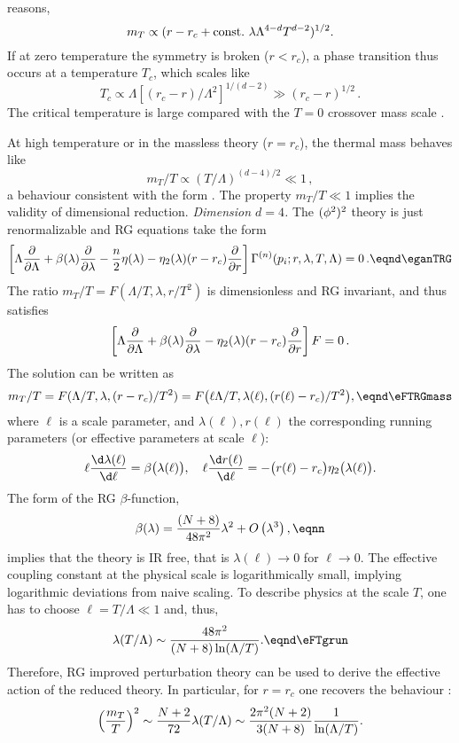 reasons,
$$m_T \propto ( r-r_c+{\rm const.}\ \lambda\Lambda^{4-d} T^{d-2})^{1/2}.$$
If at zero temperature the symmetry is broken ($r<r_c$),   a phase transition thus occurs
at a temperature $T_c$, which scales like
 $$T_c \propto \Lambda \left[(r_c-r)/\Lambda^2 \right]^{1/(d-2)} \gg (r_c-r)^{1/2} \,.$$
The critical temperature is large compared with the $T=0$ crossover mass scale \eNmcrossc.
 \par
At high temperature or in the massless theory ($r=r_c$), the thermal
mass behaves like
$$m_T  /T\propto ( T/\Lambda )^{(d-4)/2}\ll 1\,,$$
a behaviour consistent with the form \eNTmTfivv.
The property  $  m_T/T \ll 1 $ implies the validity of dimensional reduction.
\smallskip
{\it Dimension $d=4$.} The $(\phi^2)^2$ theory is just renormalizable and RG equations take the form
$$ \left[ \Lambda{  \partial \over  \partial \Lambda}
+\beta(\lambda){ \partial \over
 \partial \lambda}-{n \over 2}\eta
(\lambda)-\eta_{2}(\lambda)(r-r_c){ \partial \over  \partial r}
\right] \Gamma^{(n)}  (p_{i};r,\lambda,T,\Lambda
 )=0\,. \eqnd\eganTRG $$
The ratio $m_T/T=F( \Lambda /T, \lambda,r/T^2 )$  is dimensionless and
RG invariant, and thus  satisfies
$$ \left[ \Lambda{  \partial \over  \partial \Lambda}
+\beta(\lambda){ \partial \over
 \partial \lambda}-\eta_{2}(\lambda)(r-r_c){ \partial \over  \partial r}
\right] F=0\,.$$
The solution can be written as
$$  m_T/T=F(\Lambda /T, \lambda,  (r-r_c)/T^2)=F\bigl(\ell
\Lambda/T,\lambda(\ell ), ( r(\ell)-r_c)/T^2\bigr),\eqnd\eFTRGmass $$
where $\ell $ is a scale parameter, and $\lambda(\ell ), r(\ell )$ the
corresponding running parameters (or effective parameters at scale $\ell $):
$$\ell {\d \lambda(\ell )\over \d\ell }=\beta\bigl(\lambda(\ell )\bigr), \quad
\ell {\d r(\ell )\over \d\ell }=-\bigl(r(\ell )-r_c\bigr)\eta_2\bigl(\lambda(\ell
)\bigr).$$
The form of the RG $\beta$-function,
$$\beta(\lambda)={(N+8) \over 48\pi^2}\lambda^2+O\left(\lambda^{3}
\right), \eqnn $$
implies that the theory is IR free,  that is $\lambda(\ell )\to 0$ for $\ell
\to 0$. The effective coupling constant at the physical scale is
logarithmically small, implying logarithmic
deviations from naive scaling. To describe physics at the  scale
$T $, one has to
choose $\ell =T/\Lambda  \ll1$  and, thus,
$$\lambda(T/\Lambda  )\sim {48 \pi^2 \over (N+8)\ln(\Lambda
/T)}. \eqnd\eFTgrun $$
Therefore, RG improved perturbation theory can be used to derive the effective action of the reduced theory. In particular, for $r=r_c$ one recovers the behaviour \eNTmTfiviv:
$$\left(m_T\over T\right)^2\sim{N+2\over72} \lambda(T/\Lambda  )\sim {2\pi^2(N+2)\over 3(N+8)}{1\over\ln(\Lambda
/T)}.$$
